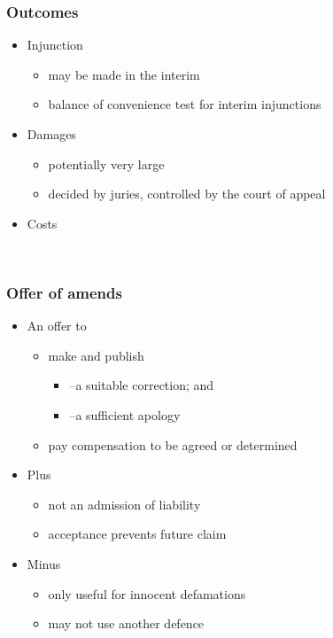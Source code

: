 \documentclass[ignorenonframetext,]{beamer}
\begin{document}
\begin{frame}
\frametitle{Outcomes}

\begin{itemize}
\item  Injunction

  \begin{itemize}
  \item    may be made in the interim
  \item    balance of convenience test for interim injunctions
  \end{itemize}
\item  Damages

  \begin{itemize}
  \item    potentially very large
  \item    decided by juries, controlled by the court of appeal
  \end{itemize}
\item  Costs
\end{itemize}

~


\end{frame}

\begin{frame}
\frametitle{Offer of amends}

\begin{itemize}
\item  An offer to

  \begin{itemize}
  \item    make and publish

    \begin{itemize}
    \item      {--}a suitable correction; and
    \item      {--}a sufficient apology
    \end{itemize}
  \item    {pay }{compensation to be agreed or determined}
  \end{itemize}
\item  {Plus}

  \begin{itemize}
  \item    {not an admission of liability}
  \item    {acceptance prevents future claim}
  \end{itemize}
\item  {Minus}

  \begin{itemize}
  \item    {only useful for innocent defamations}
  \item    {may not use another defence}
  \end{itemize}
\end{itemize}

~


\end{frame}
\end{document}
